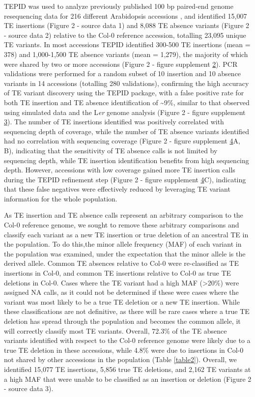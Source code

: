 \documentclass[12pt]{article}
\begin{document}
TEPID was used to analyze previously published 100 bp paired-end
genome resequencing data for 216 different Arabidopsis accessions
\cite{Schmitz:2013iu}, and identified 15,007 TE insertions (Figure 2 -
source data 1) and 8,088 TE absence variants (Figure 2 - source data
2) relative to the Col-0 reference accession, totalling 23,095 unique
TE variants. In most accessions TEPID identified 300-500 TE insertions
(mean = 378) and 1,000-1,500 TE absence variants (mean = 1,279), the
majority of which were shared by two or more accessions (Figure 2 -
figure supplement \hyperref[fig2s2]{2}).  PCR validations were
performed for a random subset of 10 insertion and 10 absence variants
in 14 accessions (totalling 280 validations), confirming the high
accuracy of TE variant discovery using the TEPID package, with a false
positive rate for both TE insertion and TE absence identification of
\textasciitilde{}9\%, similar to that observed using simulated data
and the L\emph{er} genome analysis (Figure 2 - figure supplement
\hyperref[fig2s3]{3}). The number of TE insertions identified was
positively correlated with sequencing depth of coverage, while the
number of TE absence variants identified had no correlation with
sequencing coverage (Figure 2 - figure supplement
\hyperref[fig2s4]{4}A, B), indicating that the sensitivity of TE
absence calls is not limited by sequencing depth, while TE insertion
identification benefits from high sequencing depth.  However,
accessions with low coverage gained more TE insertion calls during the
TEPID refinement step (Figure 2 - figure supplement
\hyperref[fig2s4]{4}C), indicating that these false negatives were
effectively reduced by leveraging TE variant information for the whole
population.

As TE insertion and TE absence calls represent an arbitrary comparison
to the Col-0 reference genome, we sought to remove these arbitrary
comparisons and classify each variant as a new TE insertion or true
deletion of an ancestral TE in the population. To do this,the minor
allele frequency (MAF) of each variant in the population was examined,
under the expectation that the minor allele is the derived allele.
Common TE absences relative to Col-0 were re-classified as TE insertions
in Col-0, and common TE insertions relative to Col-0 as true TE
deletions in Col-0. Cases where the TE variant had a high MAF
(\textgreater{}20\%) were assigned NA calls, as it could not be
determined if these were cases where the variant was most likely to be a
true TE deletion or a new TE insertion. While these classifications are
not definitive, as there will be rare cases where a true TE deletion has
spread through the population and becomes the common allele, it will
correctly classify most TE variants. Overall, 72.3\% of the TE absence
variants identified with respect to the Col-0 reference genome were
likely due to a true TE deletion in these accessions, while 4.8\% were
due to insertions in Col-0 not shared by other accessions in the
population (Table \ref{table2}). Overall, we identified 15,077 TE insertions, 5,856
true TE deletions, and 2,162 TE variants at a high MAF that were unable
to be classified as an insertion or deletion (Figure 2 - source data 3).
\end{document}
